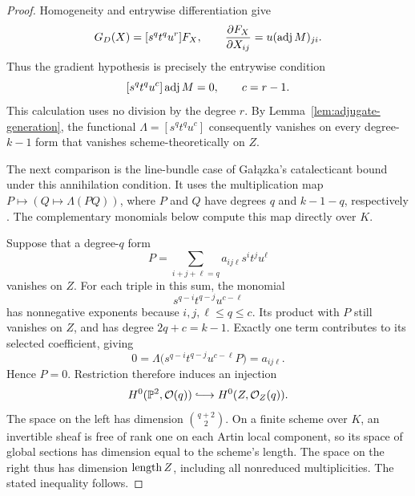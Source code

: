 \begin{proof}
Homogeneity and entrywise differentiation give
\[
 G_D(X)=[s^qt^qu^r]F_X,\qquad
 \frac{\partial F_X}{\partial X_{ij}}=u(\operatorname{adj} M)_{ji}.
\]
Thus the gradient hypothesis is precisely the entrywise condition
\begin{equation}
 \label{eq:adjugate-coefficient-zero}
 [s^qt^qu^c]\operatorname{adj} M=0,\qquad c=r-1.
\end{equation}
This calculation uses no division by the degree \(r\).
By Lemma~\ref{lem:adjugate-generation}, the functional
\(\Lambda=[s^qt^qu^c]\) consequently vanishes on every degree-\(k-1\)
form that vanishes scheme-theoretically on \(Z\).

The next comparison is the line-bundle case of Ga{\l}{\k a}zka's
catalecticant bound under this annihilation condition.  It uses the
multiplication map \(P\mapsto(Q\mapsto\Lambda(PQ))\), where \(P\) and
\(Q\) have degrees \(q\) and \(k-1-q\), respectively
\cite[Theorem~4 and Propositions~6, 7, and~9 in arXiv:1605.08005v1]{Galazka2017}.
The complementary monomials below compute this map directly over \(K\).

Suppose that a degree-\(q\) form
\[
 P=\sum_{i+j+\ell=q}a_{ij\ell}s^it^ju^\ell
\]
vanishes on \(Z\).  For each triple in this sum, the monomial
\[
 s^{q-i}t^{q-j}u^{c-\ell}
\]
has nonnegative exponents because \(i,j,\ell\le q\le c\).
Its product with \(P\) still vanishes on \(Z\), and has degree
\(2q+c=k-1\).  Exactly one term contributes to its selected
coefficient, giving
\[
 0=\Lambda\bigl(s^{q-i}t^{q-j}u^{c-\ell}P\bigr)=a_{ij\ell}.
\]
Hence \(P=0\).  Restriction therefore induces an injection
\[
 H^0(\PP^2,\cO(q))\lhook\joinrel\longrightarrow
 H^0(Z,\cO_Z(q)).
\]
The space on the left has dimension \(\binom{q+2}{2}\).
On a finite scheme over \(K\), an invertible sheaf is free of rank
one on each Artin local component, so its space of global sections
has dimension equal to the scheme's length.  The space on the right
thus has dimension \(\operatorname{length} Z\), including all nonreduced
multiplicities.  The stated inequality follows.
\end{proof}
